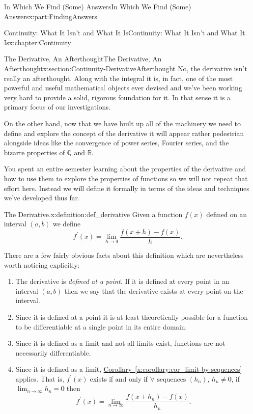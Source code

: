 \documentclass[oneside,10pt,]{book}
\newcommand{\xreffont}{\relax}
\numberwithin{equation}{section}
\def\limit#1#2#3{{\displaystyle\lim_{#1\rightarrow #2}#3}}
\newcommand{\RR}{\mathbb {R}}
\newcommand{\QQ}{\mathbb {Q}}
\begin{document}
\begin{partptx}{In Which We Find (Some) Answers}{}{In Which We Find (Some) Answers}{}{}{x:part:FindingAnswers}
\begin{chapterptx}{Continuity: What It Isn't and What It Is}{}{Continuity: What It Isn't and What It Is}{}{}{x:chapter:Continuity}
\begin{sectionptx}{The Derivative, An Afterthought}{}{The Derivative, An Afterthought}{}{}{x:section:Continuity-DerivativeAfterthought}
No, the derivative isn't really an afterthought.  Along with the integral it is, in fact, one of the most powerful and useful mathematical objects ever devised and we've been working very hard to provide a solid, rigorous foundation for it.  In that sense it is a primary focus of our investigations.%
\par
On the other hand, now that we have built up all of the machinery we need to define and explore the concept of the derivative it will appear rather pedestrian alongside ideas like the convergence of power series, Fourier series, and the bizarre properties of \(\QQ\) and \(\RR\).%
\par
You spent an entire semester learning about the properties of the derivative and how to use them to explore the properties of functions so we will not repeat that effort here.  Instead we will define it formally in terms of the ideas and techniques we've developed thus far.%
\begin{definition}{The Derivative.}{x:definition:def_derivative}%
%
Given a function \(f(x)\) defined on an interval \((a,b)\) we define%
\begin{equation*}
f^\prime(x) =
\limit{h}{0}{\frac{f(x+h)-f(x)}{h}}.{} 
\end{equation*}
%
\end{definition}
There are a few fairly obvious facts about this definition which are nevertheless worth noticing explicitly:%
\par
%
\begin{enumerate}
\item{}The derivative is \emph{defined at a point.} If it is defined at every point in an interval \((a,b)\) then we say that the derivative exists at every point on the interval.%
\item{}Since it is defined at a point it is at least theoretically possible for a function to be differentiable at a single point in its entire domain.%
\item{}Since it is defined as a limit and not all limits exist, functions are not necessarily differentiable.%
\item{}Since it is defined as a limit, \hyperref[x:corollary:cor_limit-by-sequences]{Corollary~{\xreffont\ref{x:corollary:cor_limit-by-sequences}}} applies.  That is, \(f^\prime(x)\) exists if and only if \(\forall \text{ sequences }
(h_n),\, h_n\ne 0\), if \(\limit{n}{\infty}{h_n}=0\) then%
\begin{equation*}
f^\prime{(x)} = \limit{n}{\infty}{\frac{f(x+h_n)-f(x)}{h_n}} \text{.}

\end{equation*}
\end{enumerate}
\end{sectionptx}
\end{chapterptx}
\end{partptx}
\end{document}
